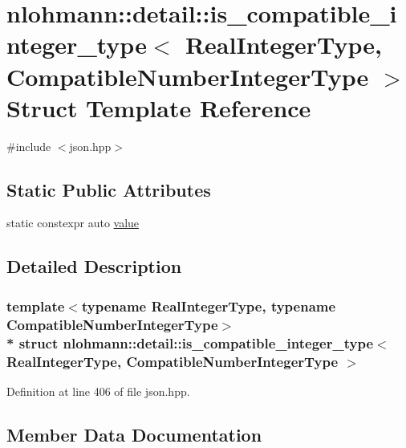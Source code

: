 \hypertarget{structnlohmann_1_1detail_1_1is__compatible__integer__type}{}\section{nlohmann\+:\+:detail\+:\+:is\+\_\+compatible\+\_\+integer\+\_\+type$<$ Real\+Integer\+Type, Compatible\+Number\+Integer\+Type $>$ Struct Template Reference}
\label{structnlohmann_1_1detail_1_1is__compatible__integer__type}


{\ttfamily \#include $<$json.\+hpp$>$}

\subsection*{Static Public Attributes}
\begin{DoxyCompactItemize}
\item 
static constexpr auto \hyperlink{structnlohmann_1_1detail_1_1is__compatible__integer__type_ac5e5bd39773676564c73d3dd2a9c6e0a}{value}
\end{DoxyCompactItemize}


\subsection{Detailed Description}
\subsubsection*{template$<$typename Real\+Integer\+Type, typename Compatible\+Number\+Integer\+Type$>$\\*
struct nlohmann\+::detail\+::is\+\_\+compatible\+\_\+integer\+\_\+type$<$ Real\+Integer\+Type, Compatible\+Number\+Integer\+Type $>$}



Definition at line 406 of file json.\+hpp.



\subsection{Member Data Documentation}

